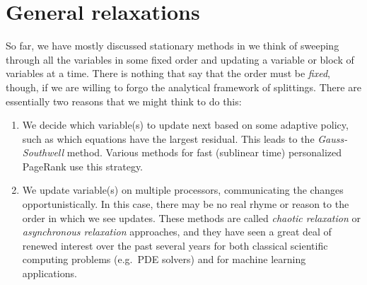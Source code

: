 \section{General relaxations}

So far, we have mostly discussed stationary methods in we think of
sweeping through all the variables in some fixed order and
updating a variable or block of variables at a time.  There is nothing
that say that the order must be {\em fixed}, though, if we are willing
to forgo the analytical framework of splittings.  There are essentially
two reasons that we might think to do this:
\begin{enumerate}
\item
  We decide which variable(s) to update next based on some adaptive
  policy, such as which equations have the largest residual.  This
  leads to the {\em Gauss-Southwell} method.  Various methods for fast
  (sublinear time) personalized PageRank use this strategy.
\item
  We update variable(s) on multiple processors, communicating the
  changes opportunistically.  In this case, there may be no real rhyme
  or reason to the order in which we see updates.  These methods are
  called {\em chaotic relaxation} or {\em asynchronous relaxation}
  approaches, and they have seen a great deal of renewed interest over
  the past several years for both classical scientific computing problems
  (e.g.~PDE solvers) and for machine learning applications.
\end{enumerate}
